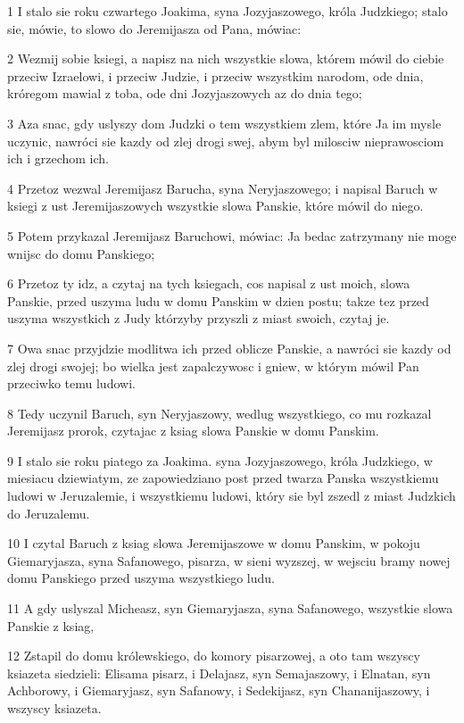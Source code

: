 \par 1 I stalo sie roku czwartego Joakima, syna Jozyjaszowego, króla Judzkiego; stalo sie, mówie, to slowo do Jeremijasza od Pana, mówiac:
\par 2 Wezmij sobie ksiegi, a napisz na nich wszystkie slowa, którem mówil do ciebie przeciw Izraelowi, i przeciw Judzie, i przeciw wszystkim narodom, ode dnia, króregom mawial z toba, ode dni Jozyjaszowych az do dnia tego;
\par 3 Aza snac, gdy uslyszy dom Judzki o tem wszystkiem zlem, które Ja im mysle uczynic, nawróci sie kazdy od zlej drogi swej, abym byl milosciw nieprawosciom ich i grzechom ich.
\par 4 Przetoz wezwal Jeremijasz Barucha, syna Neryjaszowego; i napisal Baruch w ksiegi z ust Jeremijaszowych wszystkie slowa Panskie, które mówil do niego.
\par 5 Potem przykazal Jeremijasz Baruchowi, mówiac: Ja bedac zatrzymany nie moge wnijsc do domu Panskiego;
\par 6 Przetoz ty idz, a czytaj na tych ksiegach, cos napisal z ust moich, slowa Panskie, przed uszyma ludu w domu Panskim w dzien postu; takze tez przed uszyma wszystkich z Judy którzyby przyszli z miast swoich, czytaj je.
\par 7 Owa snac przyjdzie modlitwa ich przed oblicze Panskie, a nawróci sie kazdy od zlej drogi swojej; bo wielka jest zapalczywosc i gniew, w którym mówil Pan przeciwko temu ludowi.
\par 8 Tedy uczynil Baruch, syn Neryjaszowy, wedlug wszystkiego, co mu rozkazal Jeremijasz prorok, czytajac z ksiag slowa Panskie w domu Panskim.
\par 9 I stalo sie roku piatego za Joakima. syna Jozyjaszowego, króla Judzkiego, w miesiacu dziewiatym, ze zapowiedziano post przed twarza Panska wszystkiemu ludowi w Jeruzalemie, i wszystkiemu ludowi, który sie byl zszedl z miast Judzkich do Jeruzalemu.
\par 10 I czytal Baruch z ksiag slowa Jeremijaszowe w domu Panskim, w pokoju Giemaryjasza, syna Safanowego, pisarza, w sieni wyzszej, w wejsciu bramy nowej domu Panskiego przed uszyma wszystkiego ludu.
\par 11 A gdy uslyszal Micheasz, syn Giemaryjasza, syna Safanowego, wszystkie slowa Panskie z ksiag,
\par 12 Zstapil do domu królewskiego, do komory pisarzowej, a oto tam wszyscy ksiazeta siedzieli: Elisama pisarz, i Delajasz, syn Semajaszowy, i Elnatan, syn Achborowy, i Giemaryjasz, syn Safanowy, i Sedekijasz, syn Chananijaszowy, i wszyscy ksiazeta.
